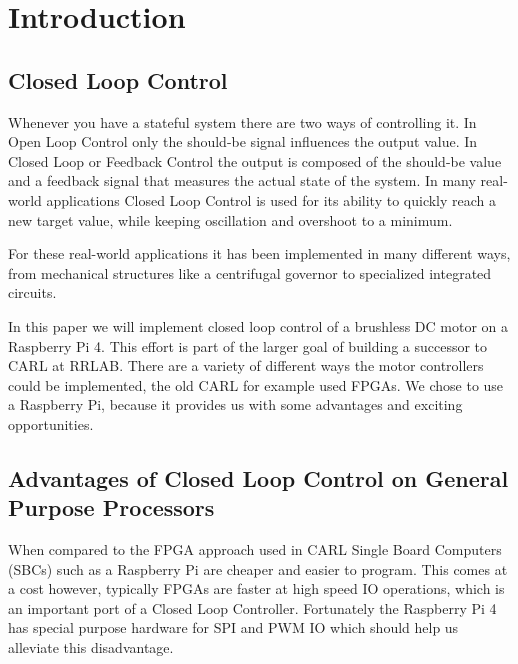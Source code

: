 \chapter{Introduction}
\label{chap:introduction}

\begin{comment}
FPGA expensive, slow and takes long to develop
RaspberryPi cheap and has hardware acceleration for SPI and PWM
Rust as new language competitive to C?
Bare-metal still necessary with modern Microprocessors and Real-time Linux?
What if we want to implement something different from linear control?

Closed loop control not a new problem
better results the higher the control frequency
Can we build a fast control loop while staying on Linux?
\end{comment}



\section{Closed Loop Control}
Whenever you have a stateful system there are two ways of controlling it.
In Open Loop Control only the should-be signal influences the output value.
In Closed Loop or Feedback Control the output is composed of the should-be value and a feedback signal that measures the actual state of the system.
In many real-world applications Closed Loop Control is used for its ability to quickly reach a new target value, while keeping oscillation and overshoot to a minimum.

For these real-world applications it has been implemented in many different ways,
from mechanical structures like a centrifugal governor to specialized integrated circuits.

In this paper we will implement closed loop control of a brushless DC motor on a Raspberry Pi 4.
This effort is part of the larger goal of building a successor to CARL\cite{CARL} at RRLAB.
There are a variety of different ways the motor controllers could be implemented, the old CARL for example used FPGAs.
We chose to use a Raspberry Pi, because it provides us with some advantages and exciting opportunities.

\section{Advantages of Closed Loop Control on General Purpose Processors}
When compared to the FPGA approach used in CARL Single Board Computers (SBCs) such as a Raspberry Pi are cheaper and easier to program.
This comes at a cost however, typically FPGAs are faster at high speed IO operations, which is an important port of a Closed Loop Controller.
Fortunately the Raspberry Pi 4 has special purpose hardware for SPI and PWM IO which should help us alleviate this disadvantage.

